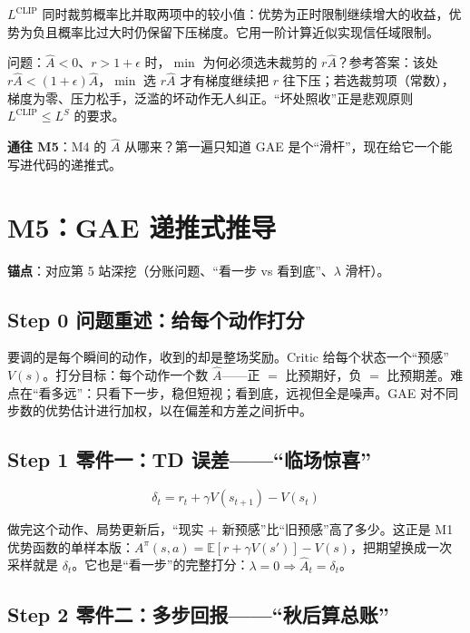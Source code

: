 \documentclass[UTF8,12pt,a4paper]{ctexrep}
\newcommand{\plain}[1]{\begin{plainbox}#1\end{plainbox}}
\newcommand{\pin}[1]{\begin{pinbox}#1\end{pinbox}}
\newcommand{\selfcheck}[1]{\begin{checkb}#1\end{checkb}}
\begin{document}
\pin{$L^{\mathrm{CLIP}}$ 同时裁剪概率比并取两项中的较小值：优势为正时限制继续增大的收益，优势为负且概率比过大时仍保留下压梯度。它用一阶计算近似实现信任域限制。}

\selfcheck{问题：$\hat{A}<0$、$r>1+\epsilon$ 时，$\min$ 为何必须选未裁剪的 $r\hat{A}$？\quad 参考答案：该处 $r\hat{A} < (1+\epsilon)\hat{A}$，$\min$ 选 $r\hat{A}$ 才有梯度继续把 $r$ 往下压；若选裁剪项（常数），梯度为零、压力松手，泛滥的坏动作无人纠正。``坏处照收''正是悲观原则 $L^{\mathrm{CLIP}}\le L^{S}$ 的要求。}

\textbf{通往 M5}：M4 的 $\hat{A}$ 从哪来？第一遍只知道 GAE 是个``滑杆''，现在给它一个能写进代码的递推式。

\section{M5：GAE 递推式推导}

\textbf{锚点}：对应第 5 站深挖（分账问题、``看一步 vs 看到底''、$\lambda$ 滑杆）。

\subsection*{Step 0 \; 问题重述：给每个动作打分}

要调的是每个瞬间的动作，收到的却是整场奖励。Critic 给每个状态一个``预感''$V(s)$。打分目标：每个动作一个数 $\hat{A}$——正 $=$ 比预期好，负 $=$ 比预期差。难点在``看多远''：只看下一步，稳但短视；看到底，远视但全是噪声。GAE 对不同步数的优势估计进行加权，以在偏差和方差之间折中。

\subsection*{Step 1 \; 零件一：TD 误差——``临场惊喜''}

$$
\delta_t = r_t + \gamma V(s_{t+1}) - V(s_t)
$$

\plain{做完这个动作、局势更新后，``现实 $+$ 新预感''比``旧预感''高了多少。这正是 M1 优势函数的单样本版：$A^\pi(s,a) = \mathbb{E}[r + \gamma V(s')] - V(s)$，把期望换成一次采样就是 $\delta_t$。它也是``看一步''的完整打分：$\lambda = 0 \Rightarrow \hat{A}_t = \delta_t$。}

\subsection*{Step 2 \; 零件二：多步回报——``秋后算总账''}
\end{document}
